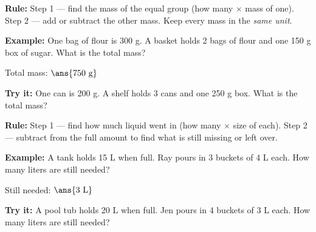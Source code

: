 \documentclass[12pt]{article}
\begin{document}

\begin{formulabox}
\textbf{Rule:} Step 1 --- find the mass of the equal group (how many
$\times$ mass of one). Step 2 --- add or subtract the other mass. Keep every
mass in the \emph{same unit}.
\end{formulabox}

\begin{examplebox}
\textbf{Example:} One bag of flour is 300 g. A basket holds 2 bags of flour
and one 150 g box of sugar. What is the total mass?

Total mass: $\ans{750\ \text{g}}$
\end{examplebox}

\begin{tryitbox}
\textbf{Try it:} One can is 200 g. A shelf holds 3 cans and one 250 g box.
What is the total mass?\\[2pt]
\end{tryitbox}


\begin{formulabox}
\textbf{Rule:} Step 1 --- find how much liquid went in (how many
$\times$ size of each). Step 2 --- subtract from the full amount to find what
is still missing or left over.
\end{formulabox}

\begin{examplebox}
\textbf{Example:} A tank holds 15 L when full. Ray pours in 3 buckets of 4 L
each. How many liters are still needed?

Still needed: $\ans{3\ \text{L}}$
\end{examplebox}

\begin{tryitbox}
\textbf{Try it:} A pool tub holds 20 L when full. Jen pours in 4 buckets of
3 L each. How many liters are still needed?\\[2pt]
\end{tryitbox}
\end{document}
